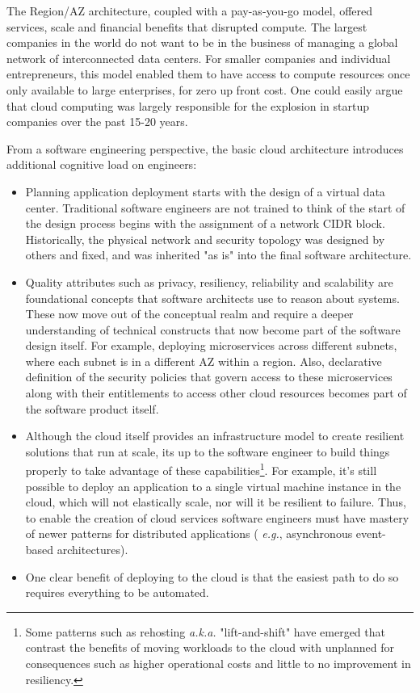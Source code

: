 \documentclass[conference]{IEEEconf}
\begin{document}
The Region/AZ architecture, coupled with a pay-as-you-go model, offered services, scale and financial benefits that disrupted compute.  The largest companies in the world do not want to be in the business of managing a global network of interconnected data centers. For smaller companies and individual entrepreneurs, this model enabled them to have access to compute resources once only available to large enterprises, for zero up front cost.  One could easily argue that cloud computing was largely responsible for the explosion in startup companies over the past 15-20 years. 

From a software engineering perspective, the basic cloud architecture introduces additional cognitive load on engineers:

\begin{itemize}
	\item Planning application deployment starts with the design of a virtual data center. Traditional software engineers are not trained to think of the start of the design process begins with the assignment of a network CIDR block. Historically, the physical network and security topology was designed by others and fixed, and was inherited "as is" into the final software architecture. 
	
	\item Quality attributes such as privacy, resiliency, reliability and scalability are foundational concepts that software architects use to reason about systems.  These now move out of the conceptual realm and require a deeper understanding of technical constructs that now become part of the software design itself.  For example, deploying microservices across different subnets, where each subnet is in a different AZ within a region. Also, declarative definition of  the security policies that govern access to these microservices along with their entitlements to access other cloud resources becomes part of the software product itself. 
	
	\item Although the cloud itself provides an infrastructure model to create resilient solutions that run at scale, its up to the software engineer to build things properly to take advantage of these capabilities\footnote{Some patterns such as rehosting\cite{engelsrud2019moving} {\em a.k.a.} "lift-and-shift" have emerged that contrast the benefits of moving workloads to the cloud with unplanned for consequences such as higher operational costs and little to no improvement in resiliency.}.  For example, it's still possible to deploy an application to a single virtual machine instance in the cloud, which will not elastically scale, nor will it be resilient to failure.  Thus, to enable the creation of cloud services software engineers must have mastery of newer patterns for distributed applications ( {\em e.g.}, asynchronous event-based architectures).
	
	\item One clear benefit of deploying to the cloud is that the easiest path to do so requires everything to be automated. 
	
\end{itemize}
\end{document}
